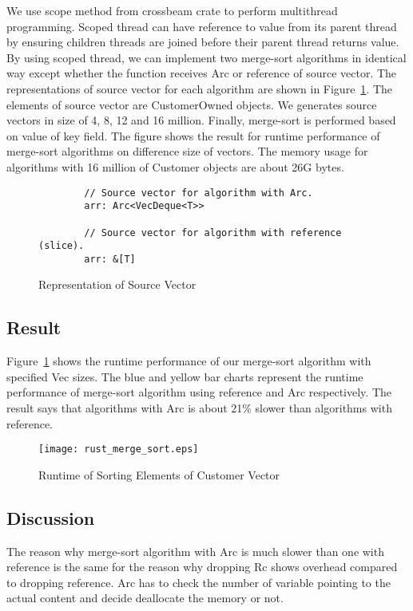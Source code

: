 We use scope method from crossbeam crate to perform multithread programming. 
Scoped thread can have reference to value from its parent thread by ensuring children threads are joined before their parent thread returns value. 
By using scoped thread, we can implement two merge-sort algorithms in identical way except whether the function receives Arc or reference of source vector.
The representations of source vector for each algorithm are shown in Figure~\ref{fig:source_merge_sort}.
The elements of source vector are CustomerOwned objects. We generates source vectors in size of 4, 8, 12 and 16 million.
Finally, merge-sort is performed based on value of key field. The figure shows the result for runtime performance of merge-sort algorithms on difference size of vectors. 
The memory usage for algorithms with 16 million of Customer objects are about 26G bytes. 
\begin{figure}[htb]
    \begin{lstlisting}
        // Source vector for algorithm with Arc.
        arr: Arc<VecDeque<T>>

        // Source vector for algorithm with reference (slice).
        arr: &[T]
    \end{lstlisting}
    \caption{Representation of Source Vector}
    \label{fig:source_merge_sort}
\end{figure}


\subsection{Result}
Figure~\ref{fig:source_merge_sort} shows the runtime performance of our merge-sort algorithm with specified Vec sizes. 
The blue and yellow bar charts represent the runtime performance of merge-sort algorithm using reference and Arc respectively. 
The result says that algorithms with Arc is about 21\% slower than algorithms with reference.


\begin{figure}[htb]
    \texttt{[image: rust\_merge\_sort.eps]}
    \caption{Runtime of Sorting Elements of Customer Vector}
    \label{fig:merge_sort}
\end{figure}

\subsection{Discussion}
The reason why merge-sort algorithm with Arc is much slower than one with reference is 
the same for the reason why dropping Rc shows overhead compared to dropping reference.
Arc has to check the number of variable pointing to the actual content and decide 
deallocate the memory or not.

